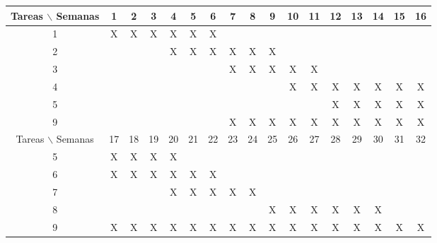 \documentclass[12pt]{article}
\begin{document}
\begin{table}[htb]
	\begin{tabular}{|c|cccccccccccccccc| }
	\hline
	Tareas $\backslash$ Semanas & 1 & 2 & 3 & 4 & 5 & 6 & 7 & 8 & 9 & 10 & 11 & 12 & 13 & 14 & 15 & 16  \\
	\hline
	1 & X & X & X & X & X & X &   &   &   &   &   &   &   &   &   &   \\
	2 &   &   &   & X & X & X & X & X & X &   &   &   &   &   &   &   \\
	3 &   &   &   &   &   &   & X & X & X & X & X &   &   &   &   &   \\
	4 &   &   &   &   &   &   &   &   &   & X & X & X & X & X & X & X \\
	5 &   &   &   &   &   &   &   &   &   &   &   & X & X & X & X & X \\
	9 &   &   &   &   &   &   & X & X & X & X & X & X & X & X & X & X \\

	\hline
	Tareas $\backslash$ Semanas & 17 & 18 & 19 & 20 & 21 & 22 & 23 & 24 & 25 & 26 & 27 & 28 & 29 & 30 & 31 & 32  \\
	\hline
	5 & X & X & X & X &   &   &   &   &   &   &   &   &   &   &   &   \\
	6 & X & X & X & X & X & X &   &   &   &   &   &   &   &   &   &   \\
	7 &   &   &   & X & X & X & X & X &   &   &   &   &   &   &   &   \\
	8 &   &   &   &   &   &   &   &   & X & X & X & X & X & X &   &   \\
	9 & X & X & X & X & X & X & X & X & X & X & X & X & X & X & X & X \\


	\hline
	\end{tabular}
\end{table}
\vspace{1mm}
\end{document}
